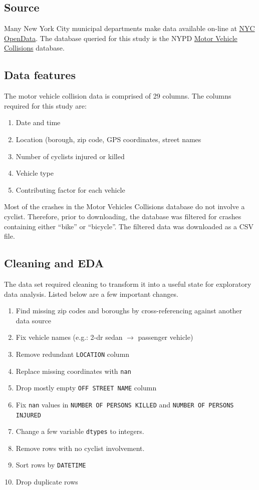 \documentclass[twocolumn,oneside]{article}
\begin{document}
\subsection{Source}

Many New York City municipal departments make data available on-line
at \href{https://opendata.cityofnewyork.us/}{NYC OpenData}.  The
database queried for this study is the NYPD
\href{https://data.cityofnewyork.us/Public-Safety/Motor-Vehicle-Collisions-Crashes/h9gi-nx95}{Motor
  Vehicle Collisions} database.

\subsection{Data features}

The motor vehicle collision data is comprised of 29 columns.  The
columns required for this study are:

\begin{enumerate}
\item Date and time
\item Location (borough, zip code, GPS coordinates, street names
\item Number of cyclists injured or killed
\item Vehicle type
\item Contributing factor for each vehicle
\end{enumerate}

Most of the crashes in the Motor Vehicles Collisions database do not
involve a cyclist.  Therefore, prior to downloading, the database was
filtered for crashes containing either ``bike'' or ``bicycle''.  The
filtered data was downloaded as a CSV file.

\subsection{Cleaning and EDA}
The data set required cleaning to transform it into a useful state for
exploratory data analysis.  Listed below are a few important changes.

\begin{enumerate}
\item Find missing zip codes and boroughs by cross-referencing against
  another data source
\item Fix vehicle names (e.g.: 2-dr sedan $\rightarrow$ passenger
  vehicle)
\item Remove redundant \verb+LOCATION+ column
\item Replace missing coordinates with \verb+nan+
\item Drop mostly empty \verb+OFF STREET NAME+ column
\item Fix \verb+nan+ values in \verb+NUMBER OF PERSONS KILLED+ and
  \verb+NUMBER OF PERSONS INJURED+
\item Change a few variable \verb+dtypes+ to integers.
\item Remove rows with no cyclist involvement.
\item Sort rows by \verb+DATETIME+
\item Drop duplicate rows
    
\end{enumerate}
  
\end{document}
